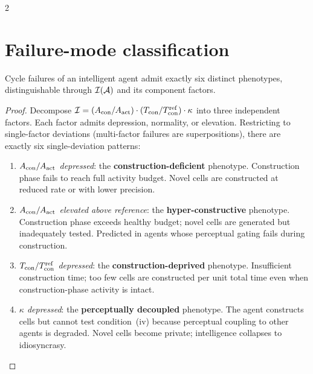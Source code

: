 \begin{multicols}{2}

\section{Failure-mode classification}
\label{sec:ch05-phenotypes}

\begin{theorem}\label{thm:ch05-t7}
Cycle failures of an intelligent agent admit exactly six distinct phenotypes,
distinguishable through $\mathcal{I}(\mathcal{A})$ and its component factors.
\end{theorem}

\begin{proof}
Decompose $\mathcal{I} = (A_{\mathrm{con}}/A_{\mathrm{act}}) \cdot (T_{\mathrm{con}}/T_{\mathrm{con}}^{\mathrm{ref}}) \cdot \kappa$ into
three independent factors. Each factor admits depression, normality, or elevation.
Restricting to single-factor deviations (multi-factor failures are superpositions),
there are exactly six single-deviation patterns:

\begin{enumerate}[label=\textbf{(P\arabic*)}]
\item \emph{$A_{\mathrm{con}}/A_{\mathrm{act}}$ depressed}: the \textbf{construction-deficient} phenotype.
  Construction phase fails to reach full activity budget. Novel cells are constructed at
  reduced rate or with lower precision.

\item \emph{$A_{\mathrm{con}}/A_{\mathrm{act}}$ elevated above reference}: the \textbf{hyper-constructive}
  phenotype. Construction phase exceeds healthy budget; novel cells are generated but
  inadequately tested. Predicted in agents whose perceptual gating fails during
  construction.

\item \emph{$T_{\mathrm{con}}/T_{\mathrm{con}}^{\mathrm{ref}}$ depressed}: the \textbf{construction-deprived}
  phenotype. Insufficient construction time; too few cells are constructed per unit total
  time even when construction-phase activity is intact.

\item \emph{$\kappa$ depressed}: the \textbf{perceptually decoupled} phenotype. The
  agent constructs cells but cannot test condition~(iv) because perceptual coupling to
  other agents is degraded. Novel cells become private; intelligence collapses to
  idiosyncrasy.


\end{enumerate}
\end{proof}
\end{multicols}

